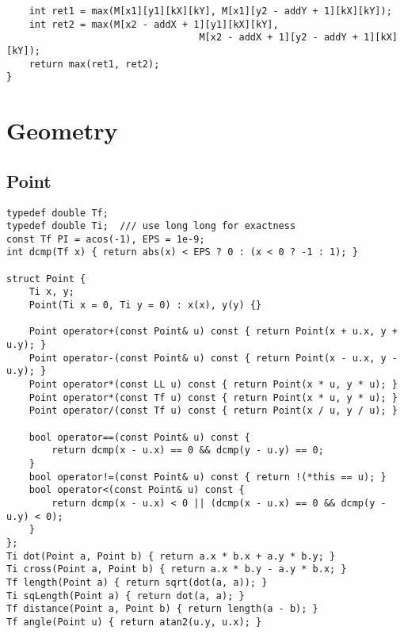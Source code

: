 \documentclass[FSZ,a4paper,onesided]{article}
\begin{document}
\begin{multicols*}{\COLS}
\begin{lstlisting}
    int ret1 = max(M[x1][y1][kX][kY], M[x1][y2 - addY + 1][kX][kY]);
    int ret2 = max(M[x2 - addX + 1][y1][kX][kY],
                                  M[x2 - addX + 1][y2 - addY + 1][kX][kY]);
    return max(ret1, ret2);
}
\end{lstlisting}
\section{Geometry}
\subsection{Point}
\begin{lstlisting}
typedef double Tf;
typedef double Ti;  /// use long long for exactness
const Tf PI = acos(-1), EPS = 1e-9;
int dcmp(Tf x) { return abs(x) < EPS ? 0 : (x < 0 ? -1 : 1); }

struct Point {
    Ti x, y;
    Point(Ti x = 0, Ti y = 0) : x(x), y(y) {}

    Point operator+(const Point& u) const { return Point(x + u.x, y + u.y); }
    Point operator-(const Point& u) const { return Point(x - u.x, y - u.y); }
    Point operator*(const LL u) const { return Point(x * u, y * u); }
    Point operator*(const Tf u) const { return Point(x * u, y * u); }
    Point operator/(const Tf u) const { return Point(x / u, y / u); }

    bool operator==(const Point& u) const {
        return dcmp(x - u.x) == 0 && dcmp(y - u.y) == 0;
    }
    bool operator!=(const Point& u) const { return !(*this == u); }
    bool operator<(const Point& u) const {
        return dcmp(x - u.x) < 0 || (dcmp(x - u.x) == 0 && dcmp(y - u.y) < 0);
    }
};
Ti dot(Point a, Point b) { return a.x * b.x + a.y * b.y; }
Ti cross(Point a, Point b) { return a.x * b.y - a.y * b.x; }
Tf length(Point a) { return sqrt(dot(a, a)); }
Ti sqLength(Point a) { return dot(a, a); }
Tf distance(Point a, Point b) { return length(a - b); }
Tf angle(Point u) { return atan2(u.y, u.x); }


\end{lstlisting}
\end{multicols*}
\end{document}
